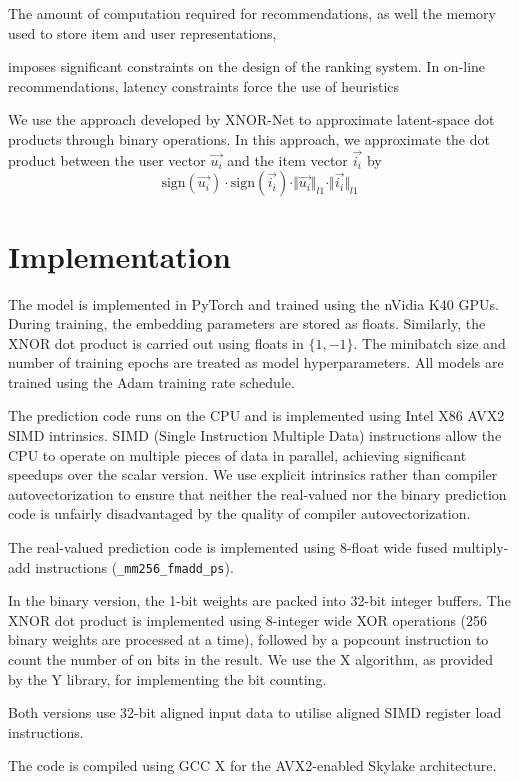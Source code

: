 \documentclass[sigconf]{acmart}
\begin{document}
The amount of computation required for recommendations, as well the memory used to store item and user representations, 

 imposes significant constraints on the design of the ranking system. In on-line recommendations, latency constraints force the use of heuristics 


We use the approach developed by XNOR-Net to approximate latent-space dot products through binary operations. In this approach, we approximate the dot product between the user vector $\vec{u_i}$ and the item vector $\vec{i_i}$ by
\begin{equation}
\mathrm{sign}(\vec{u_i}) \cdot \mathrm{sign}(\vec{i_i}) \cdot \Vert\vec{u_i}\Vert_{l1} \cdot \Vert\vec{i_i}\Vert_{l1}
\end{equation}

\section{Implementation}
The model is implemented in PyTorch and trained using the nVidia K40 GPUs. During training, the embedding parameters are stored as floats. Similarly, the XNOR dot product is carried out using floats in $\{1, -1\}$. The minibatch size and number of training epochs are treated as model hyperparameters. All models are trained using the Adam training rate schedule. 

The prediction code runs on the CPU and is implemented using Intel X86 AVX2 SIMD intrinsics. SIMD (Single Instruction Multiple Data) instructions allow the CPU to operate on multiple pieces of data in parallel, achieving significant speedups over the scalar version. We use explicit intrinsics rather than compiler autovectorization to ensure that neither the real-valued nor the binary prediction code is unfairly disadvantaged by the quality of compiler autovectorization. 

The real-valued prediction code is implemented using 8-float wide fused multiply-add instructions (\texttt{\_mm256\_fmadd\_ps}).

In the binary version, the 1-bit weights are packed into 32-bit integer buffers. The XNOR dot product is implemented using 8-integer wide XOR operations (256 binary weights are processed at a time), followed by a popcount instruction to count the number of on bits in the result. We use the X algorithm, as provided by the Y library, for implementing the bit counting. 

Both versions use 32-bit aligned input data to utilise aligned SIMD register load instructions. 

The code is compiled using GCC X for the AVX2-enabled Skylake architecture. 


%
%
\end{document}
